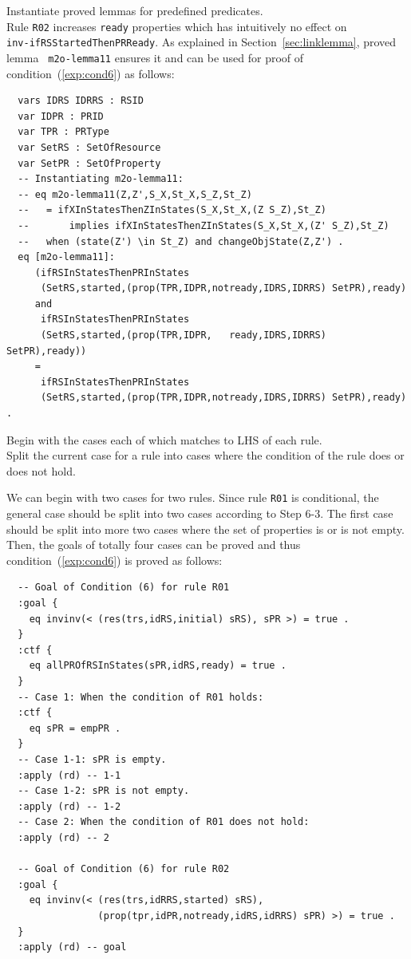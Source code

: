 \documentclass[12pt]{report}
\begin{document}
 Instantiate proved lemmas for predefined
predicates. \\ Rule {\tt R02} increases {\tt ready} properties which
has intuitively no effect on \\ {\tt inv-ifRSStartedThenPRReady}. As
explained in Section~\ref{sec:linklemma}, proved lemma {\tt
  m2o-lemma11} ensures it and can be used for proof of
condition~(\ref{exp:cond6}) as follows:
\small
\begin{verbatim}
  vars IDRS IDRRS : RSID 
  var IDPR : PRID
  var TPR : PRType
  var SetRS : SetOfResource
  var SetPR : SetOfProperty
  -- Instantiating m2o-lemma11:
  -- eq m2o-lemma11(Z,Z',S_X,St_X,S_Z,St_Z)
  --   = ifXInStatesThenZInStates(S_X,St_X,(Z S_Z),St_Z)
  --       implies ifXInStatesThenZInStates(S_X,St_X,(Z' S_Z),St_Z) 
  --   when (state(Z') \in St_Z) and changeObjState(Z,Z') .
  eq [m2o-lemma11]:
     (ifRSInStatesThenPRInStates
      (SetRS,started,(prop(TPR,IDPR,notready,IDRS,IDRRS) SetPR),ready)
     and
      ifRSInStatesThenPRInStates
      (SetRS,started,(prop(TPR,IDPR,   ready,IDRS,IDRRS) SetPR),ready))
     = 
      ifRSInStatesThenPRInStates
      (SetRS,started,(prop(TPR,IDPR,notready,IDRS,IDRRS) SetPR),ready) .
\end{verbatim}
\normalsize

 Begin with the cases each of which matches to
LHS of each rule. \\ 
 Split the current case for a rule into
cases where the condition of the rule does or does not hold. 

We can begin with two cases for two rules. Since rule {\tt R01} is
conditional, the general case should be split into two cases according
to Step 6-3. The first case should be split into more two cases
where the set of properties is or is not empty.
Then, the goals of totally four cases can be proved and
thus condition~(\ref{exp:cond6}) is proved as follows:
\small
\begin{verbatim}
  -- Goal of Condition (6) for rule R01
  :goal {
    eq invinv(< (res(trs,idRS,initial) sRS), sPR >) = true .
  }
  :ctf {
    eq allPROfRSInStates(sPR,idRS,ready) = true .
  }
  -- Case 1: When the condition of R01 holds:
  :ctf {
    eq sPR = empPR .
  }
  -- Case 1-1: sPR is empty.
  :apply (rd) -- 1-1
  -- Case 1-2: sPR is not empty.
  :apply (rd) -- 1-2
  -- Case 2: When the condition of R01 does not hold:
  :apply (rd) -- 2

  -- Goal of Condition (6) for rule R02
  :goal {
    eq invinv(< (res(trs,idRRS,started) sRS),
                (prop(tpr,idPR,notready,idRS,idRRS) sPR) >) = true .
  }
  :apply (rd) -- goal
\end{verbatim}
\normalsize
\end{document}
